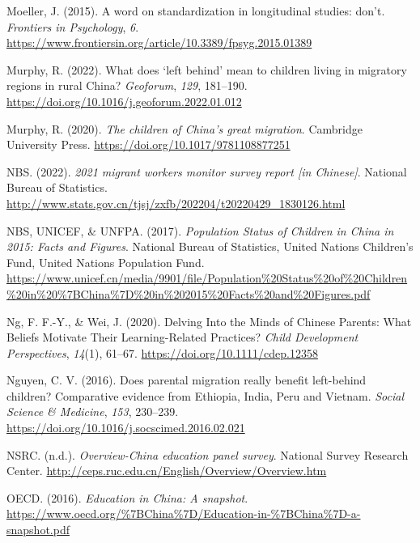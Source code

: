 \documentclass[
  man,floatsintext]{apa7}
\newlength{\cslhangindent}
\newlength{\cslentryspacingunit} %
\newenvironment{CSLReferences}[2] %
 {%
  \setlength{\parindent}{0pt}
  \ifodd #1
  \let\oldpar\par
  \def\par{\hangindent=\cslhangindent\oldpar}
  \fi
  \setlength{\parskip}{#2\cslentryspacingunit}
 }%
 {}
\begin{document}
\begin{CSLReferences}{1}{0}
\leavevmode{}%
Moeller, J. (2015). A word on standardization in longitudinal studies: don't. \emph{Frontiers in Psychology}, \emph{6}. \url{https://www.frontiersin.org/article/10.3389/fpsyg.2015.01389}

\leavevmode{}%
Murphy, R. (2022). What does {`}left behind{'} mean to children living in migratory regions in rural {China}? \emph{Geoforum}, \emph{129}, 181--190. \url{https://doi.org/10.1016/j.geoforum.2022.01.012}

\leavevmode{}%
Murphy, R. (2020). \emph{The children of {China}{'}s great migration}. Cambridge University Press. \url{https://doi.org/10.1017/9781108877251}

\leavevmode{}%
NBS. (2022). \emph{2021 migrant workers monitor survey report {[}in {Chinese}{]}}. National Bureau of Statistics. \url{http://www.stats.gov.cn/tjsj/zxfb/202204/t20220429_1830126.html}

\leavevmode{}%
NBS, UNICEF, \& UNFPA. (2017). \emph{Population Status of Children in {China} in 2015: Facts and Figures}. National Bureau of Statistics, United Nations Children's Fund, United Nations Population Fund. \url{https://www.unicef.cn/media/9901/file/Population\%20Status\%20of\%20Children\%20in\%20\%7BChina\%7D\%20in\%202015\%20Facts\%20and\%20Figures.pdf}

\leavevmode{}%
Ng, F. F.-Y., \& Wei, J. (2020). Delving Into the Minds of Chinese Parents: What Beliefs Motivate Their Learning-Related Practices? \emph{Child Development Perspectives}, \emph{14}(1), 61--67. \url{https://doi.org/10.1111/cdep.12358}

\leavevmode{}%
Nguyen, C. V. (2016). Does parental migration really benefit left-behind children? Comparative evidence from Ethiopia, India, Peru and Vietnam. \emph{Social Science \& Medicine}, \emph{153}, 230--239. \url{https://doi.org/10.1016/j.socscimed.2016.02.021}

\leavevmode{}%
NSRC. (n.d.). \emph{Overview-{China} education panel survey}. National Survey Research Center. \url{http://ceps.ruc.edu.cn/English/Overview/Overview.htm}

\leavevmode{}%
OECD. (2016). \emph{Education in {China}: A snapshot}. \url{https://www.oecd.org/\%7BChina\%7D/Education-in-\%7BChina\%7D-a-snapshot.pdf}


\end{CSLReferences}
\end{document}

